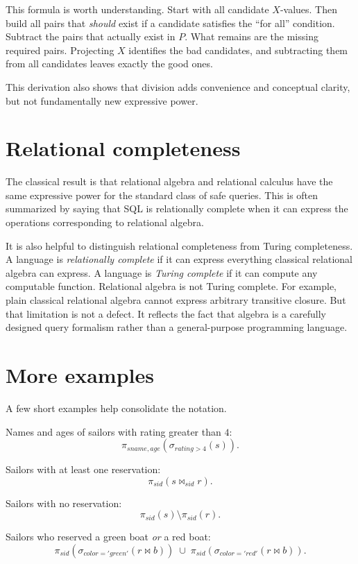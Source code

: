 \documentclass[11pt,a4paper,openany]{book}
\newcommand{\RAselect}{\sigma}
\newcommand{\RAproject}{\pi}
\newcommand{\join}{\bowtie}
\begin{document}
This formula is worth understanding. Start with all candidate \(X\)-values. Then build all pairs that \emph{should} exist if a candidate satisfies the ``for all'' condition. Subtract the pairs that actually exist in \(P\). What remains are the missing required pairs. Projecting \(X\) identifies the bad candidates, and subtracting them from all candidates leaves exactly the good ones.

This derivation also shows that division adds convenience and conceptual clarity, but not fundamentally new expressive power.

\section{Relational completeness}
The classical result is that relational algebra and relational calculus have the same expressive power for the standard class of safe queries. This is often summarized by saying that SQL is relationally complete when it can express the operations corresponding to relational algebra.

It is also helpful to distinguish relational completeness from Turing completeness. A language is \emph{relationally complete} if it can express everything classical relational algebra can express. A language is \emph{Turing complete} if it can compute any computable function. Relational algebra is not Turing complete. For example, plain classical relational algebra cannot express arbitrary transitive closure. But that limitation is not a defect. It reflects the fact that algebra is a carefully designed query formalism rather than a general-purpose programming language.

\section{More examples}
A few short examples help consolidate the notation.

Names and ages of sailors with rating greater than \(4\):
\[
\RAproject_{sname,age}(\RAselect_{rating>4}(s)).
\]

Sailors with at least one reservation:
\[
\RAproject_{sid}(s \join_{sid} r).
\]

Sailors with no reservation:
\[
\RAproject_{sid}(s)\setminus \RAproject_{sid}(r).
\]

Sailors who reserved a green boat \emph{or} a red boat:
\[
\RAproject_{sid}(\RAselect_{color='green'}(r\join b))
\;\cup\;
\RAproject_{sid}(\RAselect_{color='red'}(r\join b)).
\]
\end{document}
